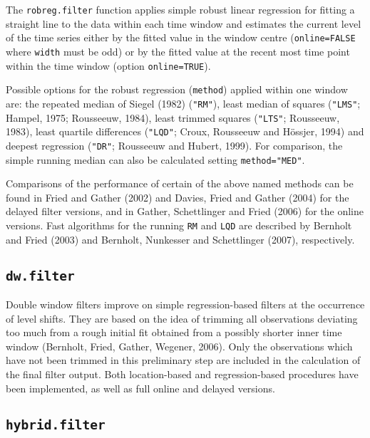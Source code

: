 \documentclass[a4paper]{scrartcl}
\begin{document}
The \texttt{robreg.filter} function applies  simple robust linear
regression for fitting a straight line to the data within each time
window and estimates the current level of the time series either by
the fitted value in the window centre (\texttt{online=FALSE} where
\texttt{width} must be odd) or by the fitted value at the recent
most time point within the time window (option
\texttt{online=TRUE}).

Possible options for the robust regression (\texttt{method})
applied within one window are: the repeated median of Siegel
(1982) (\texttt{"RM"}), least median of squares (\texttt{"LMS"};
Hampel, 1975; Rousseeuw, 1984), least trimmed squares
(\texttt{"LTS"}; Rousseeuw, 1983), least quartile differences
(\texttt{"LQD"}; Croux, Rousseeuw and H\"{o}ssjer, 1994) and deepest
regression (\texttt{"DR"}; Rousseeuw and Hubert, 1999). For
comparison, the simple running median can also be calculated
setting \texttt{method="MED"}.

Comparisons of the performance of certain of the above named
methods can be found in Fried and Gather (2002) and Davies, Fried
and Gather (2004)  for the delayed filter versions, and in Gather,
Schettlinger and Fried (2006) for the online versions. Fast
algorithms for the running \texttt{RM} and \texttt{LQD} are
described by Bernholt and Fried (2003) and Bernholt, Nunkesser and
Schettlinger (2007), respectively.

\subsection{\texttt{dw.filter}}

Double window filters improve on simple regression-based filters
at the occurrence of level shifts. They are based on the idea of
trimming all observations deviating too much from a rough initial
fit obtained from a possibly shorter inner time window (Bernholt,
Fried, Gather, Wegener, 2006). Only the observations which have
not been trimmed in this preliminary step are included in the
calculation of the final filter output. Both location-based and
regression-based procedures have been implemented, as well as full
online and delayed versions.


\subsection{\texttt{hybrid.filter}}
\end{document}

